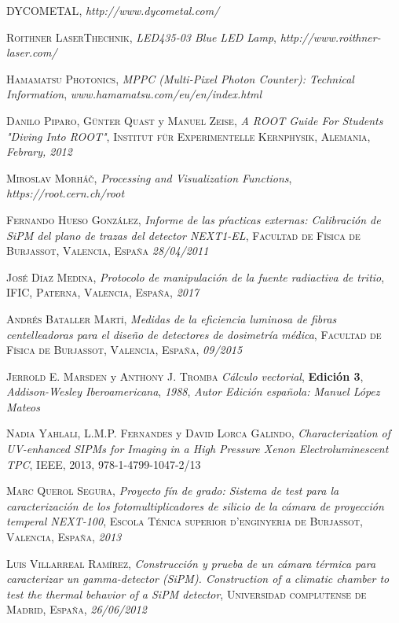 \begin{thebibliography}{99}
 \textsc{DYCOMETAL},
\textit{http://www.dycometal.com/}

 \textsc{Roithner LaserThechnik},
\textit{LED435-03 Blue LED Lamp}, \textit{http://www.roithner-laser.com/}

 \textsc{Hamamatsu Photonics},
\textit{MPPC (Multi-Pixel Photon Counter): Technical Information}, \textit{www.hamamatsu.com/eu/en/index.html}

 \textsc{Danilo Piparo}, \textsc{Günter Quast} y \textsc{Manuel Zeise},
\textit{A ROOT Guide For Students "Diving Into ROOT"}, \textsc{Institut für Experimentelle Kernphysik, Alemania}, \textit{Febrary, 2012}

 \textsc{Miroslav Morháč},
\textit{Processing and Visualization Functions}, \textit{https://root.cern.ch/root}

 \textsc{Fernando Hueso González},
\textit{Informe de las pŕacticas externas: Calibración de SiPM del plano de trazas del detector NEXT1-EL}, \textsc{Facultad de Física de Burjassot, Valencia, España} \textit{28/04/2011}

 \textsc{José Díaz Medina},
\textit{Protocolo de manipulación de la fuente radiactiva de tritio}, \textsc{IFIC, Paterna, Valencia, España}, \textit{2017}

 \textsc{Andrés Bataller Martí},
\textit{Medidas de la eficiencia luminosa de fibras centelleadoras para el diseño de detectores de dosimetría médica}, \textsc{Facultad de Física de Burjassot, Valencia, España}, \textit{09/2015}

 \textsc{Jerrold E. Marsden} y \textsc{Anthony J. Tromba}
\textit{Cálculo vectorial}, \textbf{Edición 3}, \textit{Addison-Wesley Iberoamericana}, \textit{1988}, \textit{Autor Edición española: Manuel López Mateos}

 \textsc{Nadia Yahlali}, \textsc{L.M.P. Fernandes} y \textsc{David Lorca Galindo},
\textit{Characterization of UV-enhanced SIPMs for Imaging in a High Pressure Xenon Electroluminescent TPC}, \textsc{IEEE}, \textsc{2013}, \textsc{978-1-4799-1047-2/13}

 \textsc{Marc Querol Segura},
\textit{Proyecto fín de grado: Sistema de test para la caracterización de los fotomultiplicadores de silicio de la cámara de proyección temperal NEXT-100}, \textsc{Escola Ténica superior d'enginyeria de Burjassot, Valencia, España}, \textit{2013}

 \textsc{Luis Villarreal Ramírez},
\textit{Construcción y prueba de un cámara térmica para caracterizar un gamma-detector (SiPM). Construction of a climatic chamber to test the thermal behavior of a SiPM detector}, \textsc{Universidad complutense de Madrid, España}, \textit{26/06/2012}
 
\end{thebibliography}